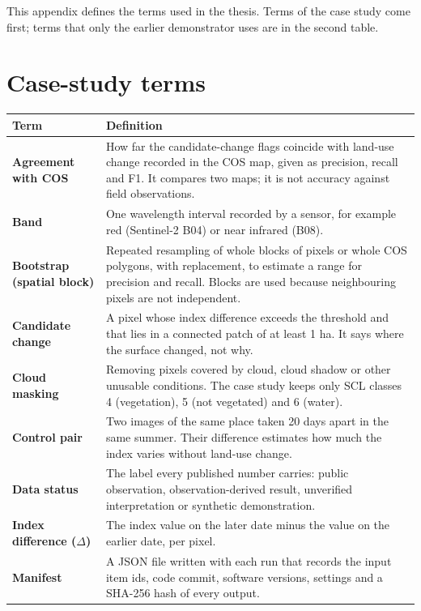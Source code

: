 

This appendix defines the terms used in the thesis. Terms of the case study come first; terms that only the earlier demonstrator uses are in the second table.

\section{Case-study terms}

{\small
\begin{longtable}{>{\raggedright\arraybackslash}p{4.63cm}>{\raggedright\arraybackslash}p{9.57cm}}
\toprule
Term & Definition \\
\midrule
\endhead
\textbf{Agreement with COS} & How far the candidate-change flags coincide with land-use change recorded in the COS map, given as precision, recall and F1. It compares two maps; it is not accuracy against field observations. \\
\textbf{Band} & One wavelength interval recorded by a sensor, for example red (Sentinel-2 B04) or near infrared (B08). \\
\textbf{Bootstrap (spatial block)} & Repeated resampling of whole blocks of pixels or whole COS polygons, with replacement, to estimate a range for precision and recall. Blocks are used because neighbouring pixels are not independent. \\
\textbf{Candidate change} & A pixel whose index difference exceeds the threshold and that lies in a connected patch of at least 1 ha. It says where the surface changed, not why. \\
\textbf{Cloud masking} & Removing pixels covered by cloud, cloud shadow or other unusable conditions. The case study keeps only SCL classes 4 (vegetation), 5 (not vegetated) and 6 (water). \\
\textbf{Control pair} & Two images of the same place taken 20 days apart in the same summer. Their difference estimates how much the index varies without land-use change. \\
\textbf{Data status} & The label every published number carries: public observation, observation-derived result, unverified interpretation or synthetic demonstration. \\
\textbf{Index difference ($\Delta$)} & The index value on the later date minus the value on the earlier date, per pixel. \\
\textbf{Manifest} & A JSON file written with each run that records the input item ids, code commit, software versions, settings and a SHA-256 hash of every output. \\

\end{longtable}}
